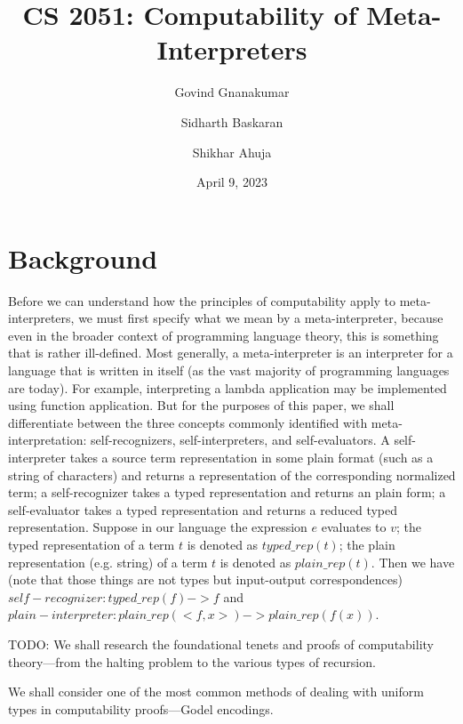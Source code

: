 \documentclass{article}
\title{CS 2051: Computability of Meta-Interpreters}
\author[1]{Govind Gnanakumar}
\author[1]{Sidharth Baskaran}
\author[1]{Shikhar Ahuja}
\affil[1]{College of Computing, Georgia Institute of Technology}
\date{April 9, 2023}
\begin{document}
\maketitle

\section{Background}

Before we can understand how the principles of computability apply to meta-interpreters, we must first specify what we mean by a meta-interpreter, because even in the broader context of programming language theory, this is something that is rather ill-defined. Most generally, a meta-interpreter is an interpreter for a language that is written in itself (as the vast majority of programming languages are today). For example, interpreting a lambda application may be implemented using function application. But for the purposes of this paper, we shall differentiate between the three concepts commonly identified with meta-interpretation: self-recognizers, self-interpreters, and self-evaluators. A self-interpreter takes a source term representation in some plain format (such as a string of characters) and returns a representation of the corresponding normalized term; a self-recognizer takes a typed representation and returns an plain form; a self-evaluator takes a typed representation and returns a reduced typed representation. Suppose in our language the expression $e$ evaluates to $v$;
the typed representation of a term $t$ is denoted as $typed\_rep(t)$;
the plain representation (e.g. string) of a term $t$ is denoted as $plain\_rep(t)$. Then we have (note that those things are not types but input-output correspondences) $self-recognizer: typed\_rep(f) -> f$ and
$plain-interpreter: plain\_rep(<f, x>) -> plain\_rep(f(x))$.

TODO:
We shall research the foundational tenets and proofs of computability theory—from the halting problem to the various types of recursion.

We shall consider one of the most common methods of dealing with uniform types in computability proofs—Godel encodings.
\end{document}
